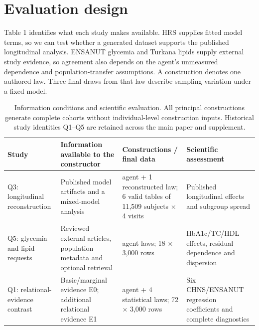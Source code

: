 \documentclass[sigconf,anonymous,review]{acmart}
\begin{document}
\section{Evaluation design}

Table 1 identifies what each study makes available. HRS supplies fitted model terms, so we can test whether a generated dataset supports the published longitudinal analysis. ENSANUT glycemia and Turkana lipids supply external study evidence, so agreement also depends on the agent's unmeasured dependence and population-transfer assumptions. A construction denotes one authored law. Three final draws from that law describe sampling variation under a fixed model.


\begin{table}[tp]

\caption{Information conditions and scientific evaluation. All principal constructions generate complete cohorts without individual-level construction inputs. Historical study identities Q1–\allowbreak{}Q5 are retained across the main paper and supplement.}

\label{tab:1}

\centering\small

\renewcommand{\arraystretch}{1.12}

\begin{tabularx}{\textwidth}{@{}>{\raggedright\arraybackslash}X>{\raggedright\arraybackslash}X>{\raggedright\arraybackslash}X>{\raggedright\arraybackslash}X@{}}

\toprule

Study & Information available to the constructor & Constructions / final data & Scientific assessment \\

\midrule

Q3: longitudinal reconstruction & Published model artifacts and a mixed-model analysis & 1 agent + 1 reconstructed law; 6 valid tables of 11,509 subjects × 4 visits & Published longitudinal effects and subgroup spread \\

Q5: glycemia and lipid requests & Reviewed external articles, population metadata and optional retrieval & 6 agent laws; 18 × 3,000 rows & HbA1c/\allowbreak{}TC/\allowbreak{}HDL effects, residual dependence and dispersion \\

Q1: relational-evidence contrast & Basic/\allowbreak{}marginal evidence E0; additional relational evidence E1 & 20 agent + 4 statistical laws; 72 × 3,000 rows & Six CHNS/\allowbreak{}ENSANUT regression coefficients and complete diagnostics \\


\end{tabularx}
\end{table}
\end{document}
